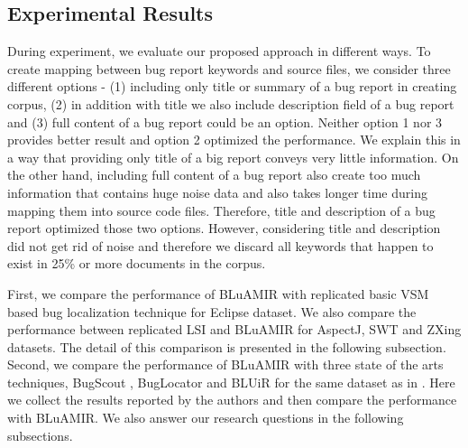 \documentclass[conference]{IEEEtran}
\begin{document}
\subsection{Experimental Results}
During experiment, we evaluate our proposed approach in different ways. To create mapping between bug report keywords and source files, we consider three different options - (1) including only title or summary of a bug report in creating corpus, (2) in addition with title we also include description field of a bug report and (3) full content of a bug report could be an option. Neither option 1 nor 3 provides better result and option 2 optimized the performance. We explain this in a way that providing only title of a big report conveys very little information. On the other hand, including full content of a bug report also create too much information that contains huge noise data and also takes longer time during mapping them into source code files. Therefore, title and description of a bug report optimized those two options. However, considering title and description did not get rid of noise and therefore we discard all keywords that happen to exist in 25\% or more documents in the corpus.

First, we compare the performance of BLuAMIR with replicated basic VSM based bug localization technique for Eclipse dataset. We also compare the performance between replicated LSI \citet{MarcusLSI} and BLuAMIR for AspectJ, SWT and ZXing datasets. The detail of this comparison is presented in the following subsection.
Second, we compare the performance of BLuAMIR with three state of the arts techniques, BugScout \cite{Nguyen}, BugLocator \cite{Jian} and BLUiR \cite{Saha} for the same dataset as in \cite{Jian}. Here we collect the results reported by the authors and then compare the performance with BLuAMIR. We also answer our research questions in the following subsections.
\end{document}
